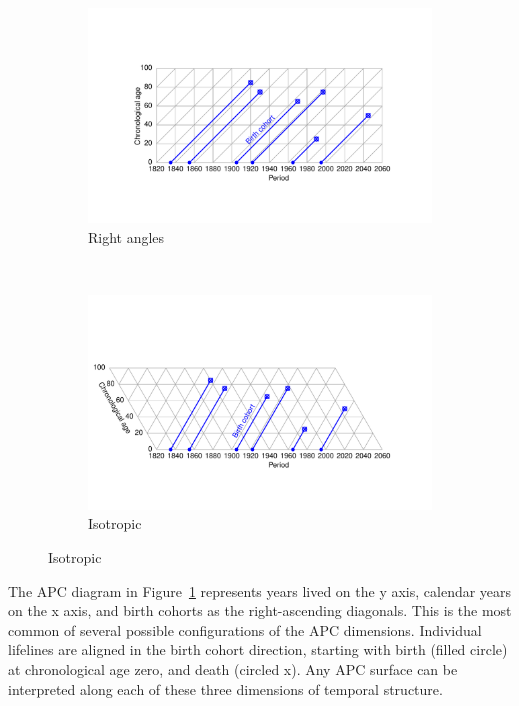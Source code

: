 \documentclass[12pt,oneside,letter]{article} %
\begin{document}
\begin{figure} 
\caption{An APC diagram in two projections.}
\label{fig:APC}
\centering
\begin{subfigure}{1.1\textwidth}
\caption{Right angles}
\vspace{-6em}
\label{fig:APCrt}
\includegraphics[scale=0.6]{Figures/APCrt.pdf}
\end{subfigure}
\\\vspace{-2em}
\begin{subfigure}{1.1\textwidth}
\caption{Isotropic}
\vspace{-6em}
\label{fig:APCeq}
\includegraphics[scale=0.6]{Figures/APCeq.pdf}
\end{subfigure}
\end{figure}

The APC diagram in Figure~\ref{fig:APCrt} represents years lived on the y axis,
calendar years on the x axis, and birth cohorts as the right-ascending
diagonals. This is the most common of several possible configurations
of the APC dimensions. Individual lifelines are aligned in the birth cohort
direction, starting with birth (filled circle) at chronological age zero, and death
(circled x). Any APC surface can be interpreted along each of these
three dimensions of temporal structure. 
\end{document}
